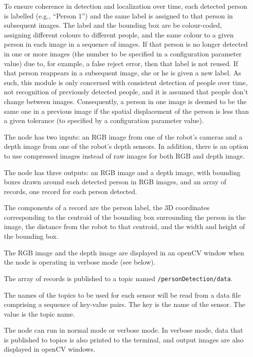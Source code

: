 \documentclass{CSSRforAfrica}
\begin{document}
{{To ensure coherence in detection and localization over time, each detected person is labelled (e.g., ``Person 1'') and the same label is assigned to that person in subsequent images.  The label and the bounding box are be colour-coded, assigning different colours to different people, and the same colour to a given person in each image in a sequence of images.   If that person is no longer detected in one or more images  (the number to be specified in a configuration parameter value) due to, for example, a false reject error, then that label is not reused. If that person reappears in a subsequent image, she or he is given a new label. As such, this module is only concerned with consistent detection of people over time, not recognition of previously detected people, and it is assumed that people don't change between images. Consequently, a person in one image is deemed to be the same one in a previous image if the spatial displacement of the person is less than a given tolerance (to specified by a configuration parameter value).

The node has two inputs: an RGB image from one of the robot's cameras and a depth image from one of the robot's depth sensors. In addition, there is an option to use compressed images instead of raw images for both RGB and depth image.
 
The node has three outputs: an RGB image and a depth image, with bounding boxes drawn around each detected person in RGB images, and an array of  records, one record for each person detected.  

The components of a record are the person label, the 3D coordinates corresponding to the centroid of the bounding box surrounding the person in the image, the distance from the robot to that centroid, and the width and height of the bounding box. 

The RGB image and the depth image are  displayed in an openCV window when the node is operating in verbose mode (see below).  

The array of records is  published to a  topic named {\small \verb+/personDetection/data+}.
 
The names of the topics to be used for each sensor will be read from a data file comprising a sequence of key-value pairs. The key is the name of the sensor. The value is the topic name.   

The node can run in normal mode or verbose mode. In verbose mode, data that is published to topics is also printed to the terminal, and output images are also displayed in openCV windows.

}}
\end{document}
